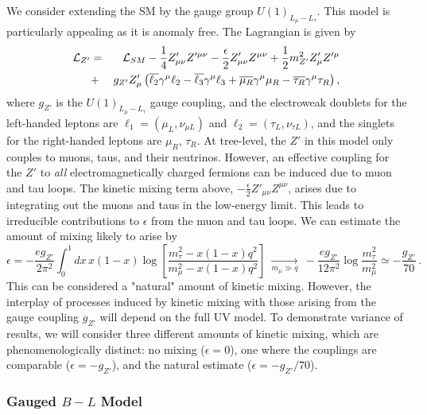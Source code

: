 \documentclass[11pt]{article}
\begin{document}
We consider extending the SM by the gauge group $U(1)_{L_\mu-L_\tau}$. This model is particularly appealing as it is anomaly free. The Lagrangian is given by
\begin{eqnarray}
 {\cal L}_{Z'} &=&{\cal L}_{SM}-\frac{1}{4}{Z}'_{\mu\nu}{Z}'^{\mu\nu}-\frac{\epsilon}{2}{Z}'_{\mu\nu}{Z}^{\mu\nu}+ \frac{1}{2}m_{Z'}^2 Z'_\mu Z'^\mu \nonumber\\
 &+&g_{Z'}Z'_\mu\left(\overline{\ell_2}\gamma^\mu\ell_2-\overline{\ell_3}\gamma^\mu\ell_3+\overline{\mu_R}\gamma^\mu\mu_R-\overline{\tau_R}\gamma^\mu\tau_R\right)  ,
 \label{eq:lag1}
\end{eqnarray}
where $g_{Z'}$ is the $U(1)_{L_\mu-L_\tau}$ gauge coupling, and the electroweak doublets for the left-handed leptons are $\ell_1=(\mu_L,\nu_{\mu L})$ and $\ell_2=(\tau_L,\nu_{\tau L})$, and the singlets for the right-handed leptons are $\mu_R$, $\tau_R$. At tree-level, the $Z'$ in this model only couples to muons, taus, and their neutrinos. However, an effective coupling for the $Z'$ to {\it all} electromagnetically charged fermions can be induced due to muon and tau loops. The kinetic mixing term above,  $-\frac{\epsilon}{2}{Z}'_{\mu\nu}{Z}^{\mu\nu}$, arises due to integrating out the muons and taus in the low-energy limit. This leads to irreducible contributions to $\epsilon$ from the muon and tau loops. We can estimate the amount of mixing likely to arise by~\cite{Escudero:2019gzq}
\begin{equation}
\epsilon =  -\frac{e g_{Z'}}{2\pi^2}  \int^1_0 d x \,  x (1-x) \log \left[\frac{m_\tau^{2} - x(1-x)q^2}{m_\mu^{2} - x(1-x)q^2}\right]  
~ \xrightarrow[  m_\mu \gg q]{} ~ 
- \frac{e g_{Z'}}{12 \pi^2}  \log \frac{m_\tau^2}{m_\mu^2}  
\simeq -  \frac{      g_{Z'} }{70}\,.
\end{equation}
This can be considered a "natural" amount of kinetic mixing. However, the interplay of processes induced by kinetic mixing with those arising from the gauge coupling $g_{Z'}$ will depend on the full UV model. To demonstrate variance of results, we will consider three different amounts of kinetic mixing, which are phenomenologically distinct: no mixing ($\epsilon=0$), one where the couplings are comparable ($\epsilon=-g_{Z'}$), and the natural estimate ($\epsilon=-g_{Z'}/70$). 



\subsubsection{Gauged $B-L$ Model}
\end{document}

